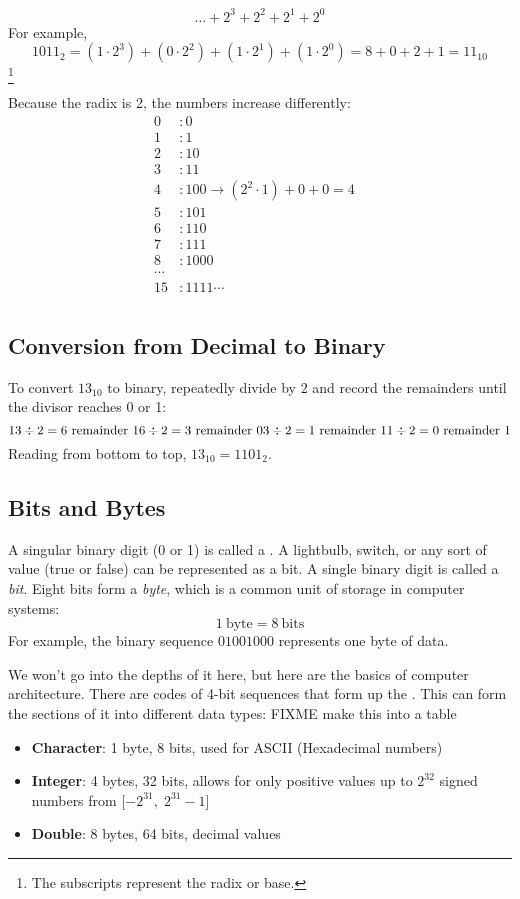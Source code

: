 \[
  \dots + 2^3 + 2^2 + 2^1 + 2^0
\]
For example,
\[
1011_2 = (1 \cdot 2^3) + (0 \cdot 2^2) + (1 \cdot 2^1) + (1 \cdot 2^0) = 8 + 0 + 2 + 1 = 11_{10}
\]\footnote{The subscripts represent the radix or base.}

Because the radix is 2, the numbers increase differently:
\begin{align*}
  0&: 0 \\
  1&: 1 \\
  2&: 10 \\
  3&: 11 \\
  4&: 100 \rightarrow (2^{2}\cdot 1) + 0 + 0 = 4 \\
  5&: 101 \\
  6&: 110 \\
  7&: 111 \\
  8&: 1000 \\
  \cdots& \\
  15&: 1111
  \cdots& \\
\end{align*}

\subsection*{Conversion from Decimal to Binary}
To convert $13_{10}$ to binary, repeatedly divide by $2$ and record the remainders until the divisor reaches 0 or 1:
\[
13 \div 2 = 6 \text{ remainder } 1 \\
6 \div 2 = 3 \text{ remainder } 0 \\
3 \div 2 = 1 \text{ remainder } 1 \\
1 \div 2 = 0 \text{ remainder } 1
\]
Reading from bottom to top, $13_{10} = 1101_2$.

\subsection{Bits and Bytes}
A singular binary digit (0 or 1) is called a . 
A lightbulb, switch, or any sort of  value (true or false) can be represented as a bit.
A single binary digit is called a \emph{bit}. 
Eight bits form a \emph{byte}, which is a common unit of storage in computer systems:
\[
1\ \text{byte} = 8\ \text{bits}
\]
For example, the binary sequence $01001000$ represents one byte of data.

We won't go into the depths of it here, but here are the basics of computer architecture. 
There are codes of 4-bit sequences that form up the . 
This can form the sections of it into different data types:
FIXME make this into a table
\begin{itemize}
  \item \textbf{Character}: 1 byte, 8 bits, used for ASCII (Hexadecimal numbers)
  \item \textbf{Integer}: 4 bytes, 32 bits, allows for only positive values up to $2^{32}$ signed numbers from [$-2^{31}, \; 2^{31}-1$]
  \item \textbf{Double}: 8 bytes, 64 bits, decimal values
\end{itemize}

